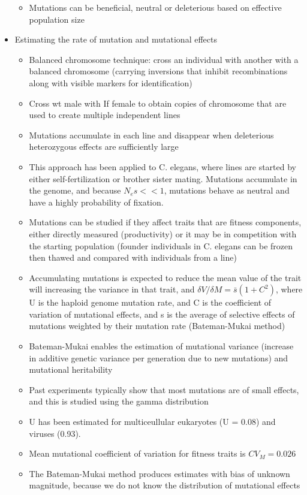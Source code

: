 \documentclass[12pt]{amsart}
\begin{document}
\begin{itemize}
\begin{itemize}
\item Mutations can be beneficial, neutral or deleterious based on effective population size
\end{itemize}
\item Estimating the rate of mutation and mutational effects
\begin{itemize}
\item Balanced chromosome technique: cross an individual with another with a balanced chromosome (carrying inversions that inhibit recombinations along with visible markers for identification) 
\item Cross wt male with If female to obtain copies of chromosome that are used to create multiple independent lines
\item Mutations accumulate in each line and disappear when deleterious heterozygous effects are sufficiently large
\item This approach has been applied to C. elegans, where lines are started by either self-fertilization or brother sister mating. Mutations accumulate in the genome, and because $N_es << 1$, mutations behave as neutral and have a highly probability of fixation. 
\item Mutations can be studied if they affect traits that are fitness components, either directly measured (productivity) or it may be in competition with the starting population (founder individuals in C. elegans can be frozen then thawed and compared with individuals from a line)
\item Accumulating mutations is expected to reduce the mean value of the trait will increasing the variance in that trait, and $\delta V/ \delta M =\bar{s}(1+C^2)$, where U is the haploid genome mutation rate, and C is the coefficient of variation of mutational effects, and s is the average of selective effects of mutations weighted by their mutation rate (Bateman-Mukai method)
\item Bateman-Mukai enables the estimation of mutational variance (increase in additive genetic variance per generation due to new mutations) and mutational heritability 
\item Past experiments typically show that most mutations are of small effects, and this is studied using the gamma distribution
\item U has been estimated for multiceullular eukaryotes (U = 0.08) and viruses (0.93). 
\item Mean mutational coefficient of variation for fitness traits is $CV_M = 0.026$ 
\item The Bateman-Mukai method produces estimates with bias of unknown magnitude, because we do not know the distribution of mutational effects 

\end{itemize}
\end{itemize}
\end{document}
